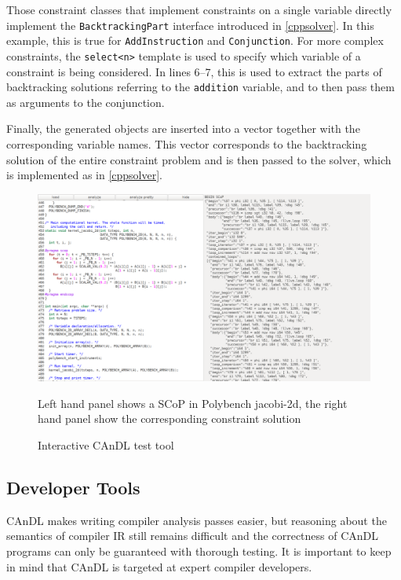     Those constraint classes that implement constraints on a single variable
    directly implement the \texttt{BacktrackingPart} interface introduced in
    \autoref{cppsolver}.
    In this example, this is true for \texttt{AddInstruction} and
    \texttt{Conjunction}.
    For more complex constraints, the \texttt{select<n>} template is used to
    specify which variable of a constraint is being considered.
    In lines 6--7, this is used to extract the parts of backtracking solutions
    referring to the \texttt{addition} variable, and to then pass them as
    arguments to the conjunction.

    Finally, the generated objects are inserted into a vector together with the
    corresponding variable names.
    This vector corresponds to the backtracking solution of the entire
    constraint problem and is then passed to the solver, which is implemented
    as in \autoref{cppsolver}.

\begin{figure}[ht]
\centering
\includegraphics[width=\textwidth]{figures/visual_gui2.png}
\caption{Interactive CAnDL test tool}
\medskip
\small
Left hand panel shows a SCoP in Polybench jacobi-2d, the right hand panel show the corresponding constraint solution
\label{fig:gui}
\end{figure}

\subsection{Developer Tools}

    CAnDL makes writing compiler analysis passes easier, but reasoning about the
    semantics of compiler IR still remains difficult and the correctness of
    CAnDL programs can only be guaranteed with thorough testing.
    It is important to keep in mind that CAnDL is targeted at expert compiler
    developers.

